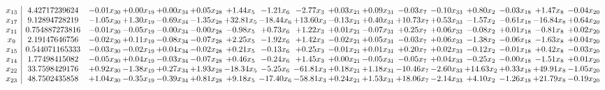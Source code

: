 \documentclass[9pt]{article}
\begin{document}
 \[\begin{array}{c| c c@{\hskip 2pt} c@{\hskip 2pt} c@{\hskip 2pt} c@{\hskip 2pt} c@{\hskip 2pt} c@{\hskip 2pt} c@{\hskip 2pt} c@{\hskip 2pt} c@{\hskip 2pt} c@{\hskip 2pt} c@{\hskip 2pt} c@{\hskip 2pt} c@{\hskip 2pt} c@{\hskip 2pt} c@{\hskip 2pt} }
 x_{13}   &  4.42717239624 & -0.01 x_{30} & +  0.00 x_{19} & +  0.00 x_{34} & +  0.05 x_{28} & +  1.44 x_{5} & -1.21 x_{6} & -2.77 x_{3} & +  0.03 x_{21} & +  0.09 x_{31} & -0.03 x_{7} & -0.10 x_{33} & +  0.80 x_{2} & -0.03 x_{18} & +  1.47 x_{8} & -0.04 x_{20}\\
 x_{17}   &  9.12894728219 & -1.05 x_{30} & +  1.30 x_{19} & -0.69 x_{34} & -1.35 x_{28} & + 32.81 x_{5} & -18.44 x_{6} & + 13.60 x_{3} & -0.13 x_{21} & +  0.40 x_{31} & + 10.73 x_{7} & +  0.53 x_{33} & -1.57 x_{2} & -0.61 x_{18} & -16.84 x_{8} & +  0.64 x_{20}\\
 x_{11}   &  0.754887273816 & -0.01 x_{30} & -0.05 x_{19} & -0.00 x_{34} & -0.00 x_{28} & -0.98 x_{5} & +  0.73 x_{6} & +  1.22 x_{3} & +  0.01 x_{21} & -0.07 x_{31} & +  0.25 x_{7} & +  0.06 x_{33} & -0.08 x_{2} & +  0.01 x_{18} & -0.81 x_{8} & +  0.02 x_{20}\\
 x_{9}   &  2.19147646756 & -0.02 x_{30} & +  0.11 x_{19} & -0.08 x_{34} & -0.07 x_{28} & +  2.25 x_{5} & -1.92 x_{6} & +  1.42 x_{3} & -0.02 x_{21} & +  0.05 x_{31} & -0.03 x_{7} & +  0.06 x_{33} & -1.38 x_{2} & -0.06 x_{18} & -1.63 x_{8} & +  0.04 x_{20}\\
 x_{15}   &  0.544071165333 & -0.03 x_{30} & -0.02 x_{19} & +  0.04 x_{34} & -0.02 x_{28} & +  0.21 x_{5} & -0.13 x_{6} & +  0.25 x_{3} & -0.01 x_{21} & +  0.01 x_{31} & +  0.20 x_{7} & +  0.02 x_{33} & -0.12 x_{2} & -0.01 x_{18} & +  0.42 x_{8} & -0.03 x_{20}\\
 x_{14}   &  1.77498415082 & -0.05 x_{30} & +  0.04 x_{19} & -0.03 x_{34} & -0.07 x_{28} & +  0.46 x_{5} & -0.24 x_{6} & +  1.45 x_{3} & +  0.00 x_{21} & -0.05 x_{31} & -0.05 x_{7} & +  0.04 x_{33} & -0.25 x_{2} & -0.00 x_{18} & -1.51 x_{8} & +  0.01 x_{20}\\
 x_{22}   &  33.7598429176 & +  0.92 x_{30} & -1.38 x_{19} & +  0.27 x_{34} & +  1.93 x_{28} & -18.34 x_{5} & -5.25 x_{6} & -61.81 x_{3} & +  0.18 x_{21} & +  1.18 x_{31} & -10.46 x_{7} & -2.60 x_{33} & + 14.63 x_{2} & +  0.33 x_{18} & + 49.91 x_{8} & -1.05 x_{20}\\
 x_{23}   &  48.7502435858 & +  1.04 x_{30} & -0.35 x_{19} & -0.39 x_{34} & +  0.81 x_{28} & +  9.18 x_{5} & -17.40 x_{6} & -58.81 x_{3} & +  0.24 x_{21} & +  1.53 x_{31} & + 18.06 x_{7} & -2.14 x_{33} & +  4.10 x_{2} & -1.26 x_{18} & + 21.79 x_{8} & -0.19 x_{20}\\

\end{array}\]
\end{document}
